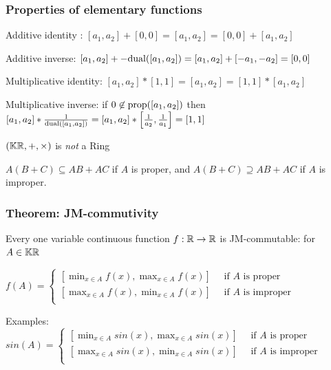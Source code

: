 \documentclass{beamer}
\begin{document}
\begin{frame}
    \frametitle{Properties of elementary functions}

    Additive identity : $[a_1, a_2] + [0, 0] = [a_1, a_2] = [0, 0] + [a_1, a_2]$
    \par Additive inverse: $[a_1, a_2] + -\text{dual}([a_1, a_2]) = [a_1, a_2] + [-a_1, -a_2] = [0, 0]$

    \vspace{7mm}
    Multiplicative identity: $[a_1, a_2] * [1, 1] = [a_1, a_2] = [1, 1] * [a_1, a_2]$
    \par Multiplicative inverse: if $0 \not\in \text{prop}([a_1, a_2])$ then $[a_1, a_2] * \frac{1}{\text{dual}([a_1, a_2])} = [a_1, a_2] * \left[\frac{1}{a_2}, \frac{1}{a_1}\right] = [1, 1]$


    \vspace{7mm}
    $(\mathbb{KR}, +, \times)$ is \textit{not} a Ring \par
    $A(B + C) \subseteq AB + AC$ if $A$ is proper, and $A(B + C) \supseteq AB + AC$ if $A$ is improper.
\end{frame}

\begin{frame}
    \frametitle{Theorem: JM-commutivity}

    Every one variable continuous function $f: \mathbb R \rightarrow \mathbb R$ is JM-commutable: for $A \in \mathbb{KR}$ \par
    \vspace{2mm}
    $f(A) = \begin{cases}
        [\min_{x \in A} f(x), \max_{x \in A} f(x)] \quad \text{ if } A \text{ is proper} \\
        [\max_{x \in A} f(x), \min_{x \in A} f(x)] \quad \text{ if } A \text{ is improper} \\
    \end{cases}$

    \vspace{7mm}
    Examples:
    \vspace{2mm}
    $sin(A) = \begin{cases}
        [\min_{x \in A} sin(x), \max_{x \in A} sin(x)] \quad \text{ if } A \text{ is proper} \\
        [\max_{x \in A} sin(x), \min_{x \in A} sin(x)] \quad \text{ if } A \text{ is improper} \\
    \end{cases}$

\end{frame}

\end{document}
